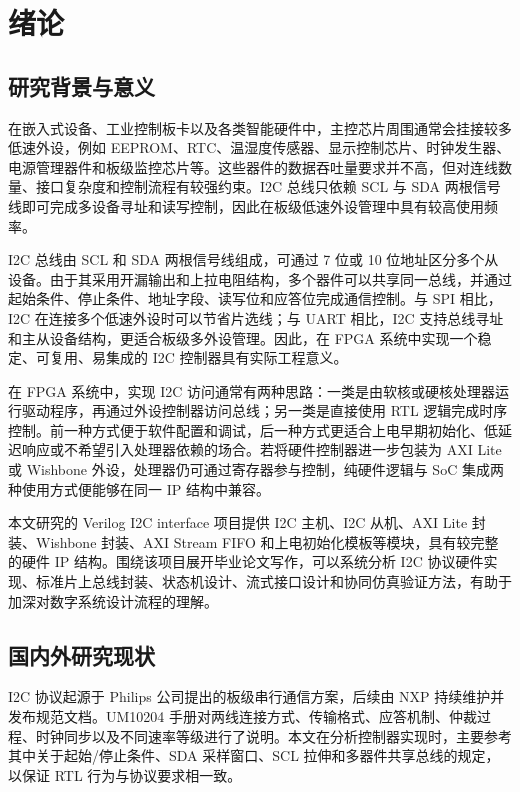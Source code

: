 \documentclass[12pt,a4paper]{article}
\numberwithin{equation}{section}
\begin{document}
\clearpage
\tableofcontents
\clearpage

\setcounter{page}{1}

\section{绪论}\label{ux7eeaux8bba}

\subsection{研究背景与意义}\label{ux7814ux7a76ux80ccux666fux4e0eux610fux4e49}

在嵌入式设备、工业控制板卡以及各类智能硬件中，主控芯片周围通常会挂接较多低速外设，例如
EEPROM、RTC、温湿度传感器、显示控制芯片、时钟发生器、电源管理器件和板级监控芯片等。这些器件的数据吞吐量要求并不高，但对连线数量、接口复杂度和控制流程有较强约束。I2C
总线只依赖 SCL 与 SDA
两根信号线即可完成多设备寻址和读写控制，因此在板级低速外设管理中具有较高使用频率。

I2C 总线由 SCL 和 SDA 两根信号线组成，可通过 7 位或 10
位地址区分多个从设备。由于其采用开漏输出和上拉电阻结构，多个器件可以共享同一总线，并通过起始条件、停止条件、地址字段、读写位和应答位完成通信控制。与
SPI 相比，I2C 在连接多个低速外设时可以节省片选线；与 UART 相比，I2C
支持总线寻址和主从设备结构，更适合板级多外设管理。因此，在 FPGA
系统中实现一个稳定、可复用、易集成的 I2C 控制器具有实际工程意义。

在 FPGA 系统中，实现 I2C
访问通常有两种思路：一类是由软核或硬核处理器运行驱动程序，再通过外设控制器访问总线；另一类是直接使用
RTL
逻辑完成时序控制。前一种方式便于软件配置和调试，后一种方式更适合上电早期初始化、低延迟响应或不希望引入处理器依赖的场合。若将硬件控制器进一步包装为
AXI Lite 或 Wishbone 外设，处理器仍可通过寄存器参与控制，纯硬件逻辑与
SoC 集成两种使用方式便能够在同一 IP 结构中兼容。

本文研究的 Verilog I2C interface 项目提供 I2C 主机、I2C 从机、AXI Lite
封装、Wishbone 封装、AXI Stream FIFO
和上电初始化模板等模块，具有较完整的硬件 IP
结构。围绕该项目展开毕业论文写作，可以系统分析 I2C
协议硬件实现、标准片上总线封装、状态机设计、流式接口设计和协同仿真验证方法，有助于加深对数字系统设计流程的理解。

\subsection{国内外研究现状}\label{ux56fdux5185ux5916ux7814ux7a76ux73b0ux72b6}

I2C 协议起源于 Philips 公司提出的板级串行通信方案，后续由 NXP
持续维护并发布规范文档。UM10204
手册对两线连接方式、传输格式、应答机制、仲裁过程、时钟同步以及不同速率等级进行了说明。本文在分析控制器实现时，主要参考其中关于起始/停止条件、SDA
采样窗口、SCL 拉伸和多器件共享总线的规定，以保证 RTL
行为与协议要求相一致。
\end{document}
